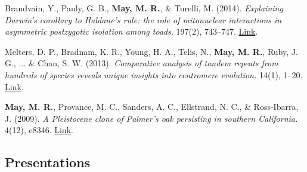 \begin{etaremune}[topsep=0pt,itemsep=1.0em,partopsep=0pt,parsep=0pt]
    \item Brandvain, Y., Pauly, G. B., \textbf{May, M. R.}, \& Turelli, M. (2014). \textit{Explaining Darwin’s corollary to Haldane’s rule: the role of mitonuclear interactions in asymmetric postzygotic isolation among toads}.  197(2), 743–747. \href{https://doi.org/10.1534/genetics.113.161133}{Link}.
    \item Melters, D. P., Bradnam, K. R., Young, H. A., Telis, N., \textbf{May, M. R.}, Ruby, J. G., ... \& Chan, S. W. (2013). \textit{Comparative analysis of tandem repeats from hundreds of species reveals unique insights into centromere evolution.}  14(1), 1–20. \href{https://genomebiology.biomedcentral.com/articles/10.1186/gb-2013-14-1-r10}{Link}.
    \item \textbf{May, M. R.}, Provance, M. C., Sanders, A. C., Ellstrand, N. C., \& Ross-Ibarra, J. (2009). \textit{A Pleistocene clone of Palmer's oak persisting in southern California.}  4(12), e8346. \href{https://journals.plos.org/plosone/article?id=10.1371/journal.pone.0008346}{Link}.
\end{etaremune}



\subsection*{Presentations}


